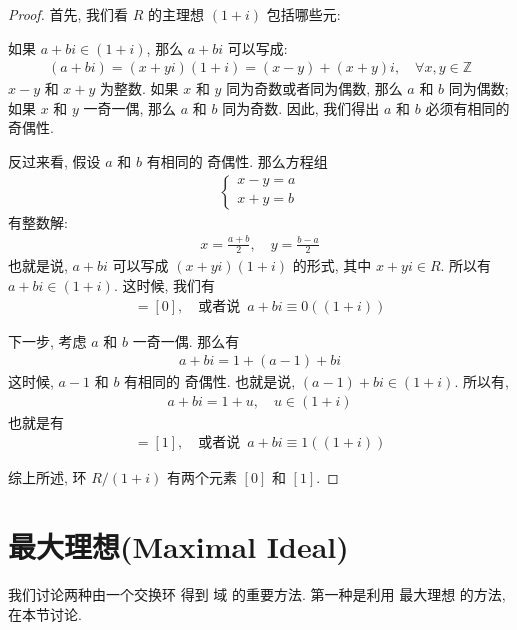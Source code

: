 \documentclass[utf8]{ctexbook}
\theoremstyle{definition}
\begin{document}
\begin{proof}
首先, 我们看 $R$ 的主理想 $(1+i)$ 包括哪些元:

如果 $a+bi \in (1+i)$, 那么 $a+bi$ 可以写成: 
\begin{align*}
(a+bi) = (x + yi)(1+i) = (x-y) + (x+y)i , \quad \forall x, y \in \mathbb{Z}
\end{align*}
$x-y$ 和 $x+y$ 为整数. 如果 $x$ 和 $y$ 同为奇数或者同为偶数, 那么 $a$ 和 $b$ 同为偶数; 如果 $x$ 和 $y$ 一奇一偶, 那么  $a$ 和 $b$ 同为奇数. 因此, 我们得出 $a$ 和 $b$ 必须有相同的 奇偶性.

反过来看, 假设 $a$ 和 $b$ 有相同的 奇偶性. 那么方程组
\begin{align*}
\left\{ 
\begin{array}{l}
x-y = a \\
x + y = b
\end{array}
\right.
\end{align*}
有整数解:
\begin{align*}
x = \frac{a+b}{2}, \quad y = \frac{b-a}{2}
\end{align*}
也就是说, $a+bi$ 可以写成 $(x + yi)(1+i)$ 的形式, 其中 $x+yi \in R$. 所以有 $a+bi \in (1+i)$. 这时候, 我们有
\begin{align*}
[a+bi] = [0] , \quad \mbox{或者说 } \, a + bi \equiv 0 ( (1+i) )
\end{align*}

下一步, 考虑 $a$ 和 $b$ 一奇一偶. 那么有
\begin{align*}
a + bi = 1 + (a-1) + bi 
\end{align*}
这时候, $a-1$ 和 $b$ 有相同的 奇偶性. 也就是说, $(a-1) + bi \in (1+i) $. 所以有,
\begin{align*}
a + b i = 1 + u, \quad u \in (1+i)
\end{align*}
也就是有
\begin{align*}
[a+bi] = [1] , \quad \mbox{或者说 } \, a + bi \equiv 1 ( (1+i) )
\end{align*}

综上所述, 环 $R/(1+i)$ 有两个元素 $[0]$ 和 $[1]$.

\end{proof}

\section{最大理想(Maximal Ideal)}

我们讨论两种由一个交换环 得到 域 的重要方法. 第一种是利用 最大理想 的方法, 在本节讨论.
\end{document}
